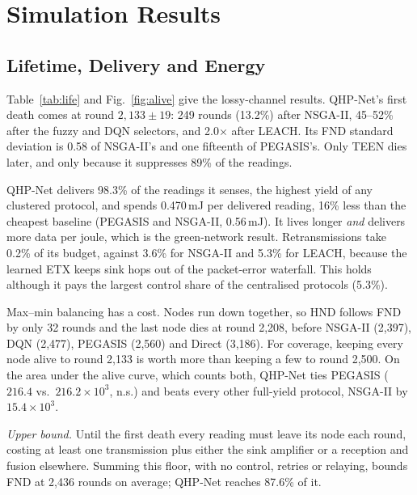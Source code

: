\documentclass[conference]{IEEEtran}
\newcommand{\fndbound}{2,436}
\newcommand{\fndfrac}{87.6}
\begin{document}
\section{Simulation Results}\label{sec:results}
\subsection{Lifetime, Delivery and Energy}
Table~\ref{tab:life} and Fig.~\ref{fig:alive} give the lossy-channel results. QHP-Net's first death comes at round $2{,}133\pm19$: 249 rounds (13.2\%) after NSGA-II, 45--52\% after the fuzzy and DQN selectors, and 2.0$\times$ after LEACH. Its FND standard deviation is 0.58 of NSGA-II's and one fifteenth of PEGASIS's. Only TEEN dies later, and only because it suppresses 89\% of the readings.

QHP-Net delivers 98.3\% of the readings it senses, the highest yield of any clustered protocol, and spends 0.470\,mJ per delivered reading, 16\% less than the cheapest baseline (PEGASIS and NSGA-II, 0.56\,mJ). It lives longer \emph{and} delivers more data per joule, which is the green-network result. Retransmissions take 0.2\% of its budget, against 3.6\% for NSGA-II and 5.3\% for LEACH, because the learned ETX keeps sink hops out of the packet-error waterfall. This holds although it pays the largest control share of the centralised protocols (5.3\%).

Max--min balancing has a cost. Nodes run down together, so HND follows FND by only 32 rounds and the last node dies at round 2,208, before NSGA-II (2,397), DQN (2,477), PEGASIS (2,560) and Direct (3,186). For coverage, keeping every node alive to round 2,133 is worth more than keeping a few to round 2,500. On the area under the alive curve, which counts both, QHP-Net ties PEGASIS ($216.4$ vs.\ $216.2\times10^3$, n.s.) and beats every other full-yield protocol, NSGA-II by $15.4\times10^3$.

\emph{Upper bound.} Until the first death every reading must leave its node each round, costing at least one transmission plus either the sink amplifier or a reception and fusion elsewhere. Summing this floor, with no control, retries or relaying, bounds FND at \fndbound{} rounds on average; QHP-Net reaches \fndfrac\% of it.
\end{document}

